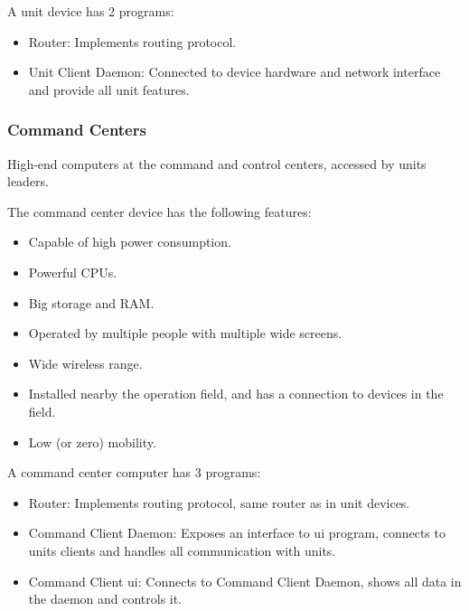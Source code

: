 A unit device has 2 programs:
\begin{itemize}[itemsep=1pt, topsep=5pt]
    \item Router: Implements routing protocol.
    \item Unit Client Daemon: Connected to device hardware and network interface and provide all unit features.
\end{itemize}

\subsubsection{Command Centers}
High-end computers at the command and control centers, accessed by units leaders.

The command center device has the following features:
\begin{itemize}[itemsep=1pt, topsep=5pt]
    \item Capable of high power consumption.
    \item Powerful CPUs.
    \item Big storage and RAM.
    \item Operated by multiple people with multiple wide screens.
    \item Wide wireless range.
    \item Installed nearby the operation field, and has a connection to devices in the field.
    \item Low (or zero) mobility.
\end{itemize}

A command center computer has 3 programs:
\begin{itemize}[itemsep=1pt, topsep=5pt]
    \item Router: Implements routing protocol, same router as in unit devices.
    \item Command Client Daemon: Exposes an interface to \acrshort{ui} program, connects to units clients and handles all communication with units.
    \item Command Client \acrshort{ui}: Connects to Command Client Daemon, shows all data in the daemon and controls it.
\end{itemize}

